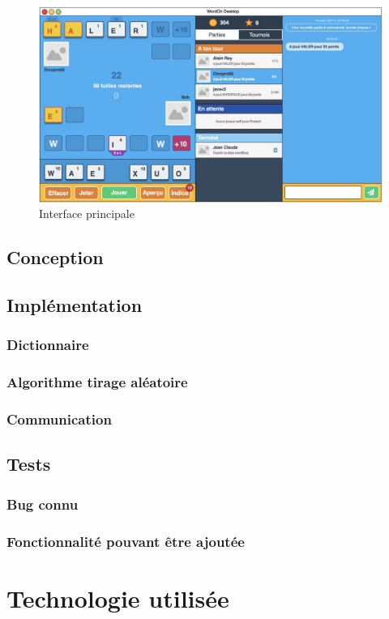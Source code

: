 \documentclass[a4paper,12pt]{article}
\begin{document}
		\begin{figure}[h]
			\centering
			\includegraphics[width=0.6\linewidth]{img/main.jpg}
			\caption{Interface principale}
		\end{figure}
		
	\subsection{Conception}
	
	\subsection{Implémentation}
	\subsubsection{Dictionnaire}
	
	\subsubsection{Algorithme tirage aléatoire}
	
	\subsubsection{Communication}
	
	\subsection{Tests}
	\subsubsection{Bug connu}
	
	\subsubsection{Fonctionnalité pouvant être ajoutée}
	
	\section{Technologie utilisée}
\end{document}
